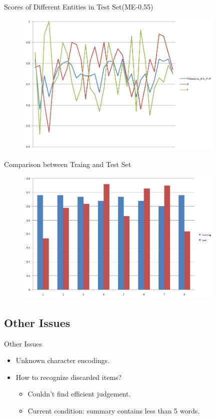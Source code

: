 \documentclass{beamer}
\begin{document}
\begin{frame}[plain]{Scores of Different Entities in Test Set(ME-0.55)}
\begin{figure}
\includegraphics[width=100mm]{entity}
\end{figure}
\end{frame}

\begin{frame}[plain]{Comparison between Traing and Test Set}
\begin{figure}
\includegraphics[width=100mm]{cmp}
\end{figure}
\end{frame}

\subsection{Other Issues}
\begin{frame}{Other Issues}
    \begin{itemize}
    \item Unknown character encodings.
    \item How to recognize discarded items?
        \begin{itemize}
        \item Couldn't find efficient judgement.
        \item Current condition: summary contains less than 5 words.
        \end{itemize}
    \end{itemize}
\end{frame}
\end{document}
